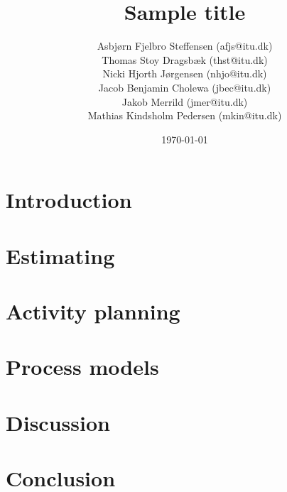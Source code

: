 \documentclass{report}
\title{Sample title}
\date{\today}
\author{Asbj\o rn Fjelbro Steffensen (afjs@itu.dk)\\ Thomas Stoy Dragsb\ae k (thst@itu.dk)\\ Nicki Hjorth J\o rgensen (nhjo@itu.dk)\\ Jacob Benjamin Cholewa (jbec@itu.dk)\\ Jakob Merrild (jmer@itu.dk)\\ Mathias Kindsholm Pedersen (mkin@itu.dk)}
\begin{document}
\maketitle
\newpage
\tableofcontents
\newpage

\chapter{Introduction}


\chapter{Estimating}

\chapter{Activity planning}






\chapter{Process models}




\chapter{Discussion}

\chapter{Conclusion}
\end{document}
